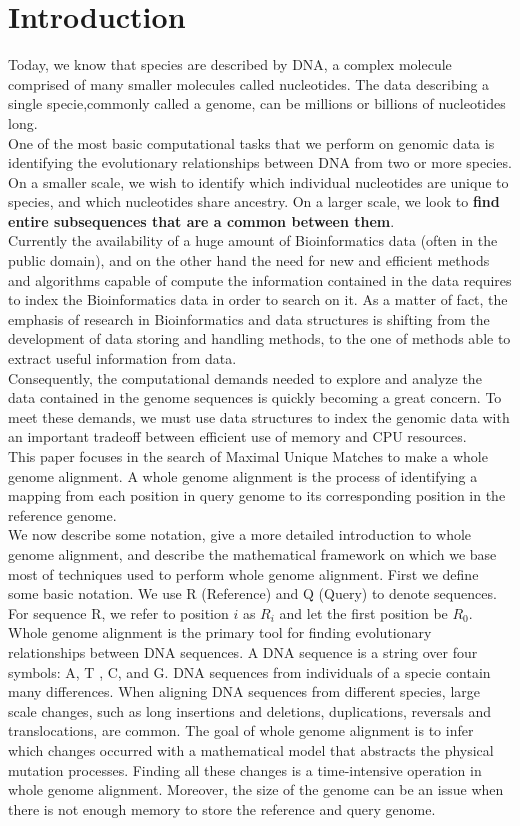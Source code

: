 \documentclass[runningheads,a4paper]{llncs}
\begin{document}
{\section{Introduction}
Today, we know that species are described by DNA, a complex molecule comprised of many smaller molecules called nucleotides. The data describing a single specie,commonly called a genome, can be millions or billions of nucleotides long.\\
One of the most basic computational tasks that we perform on genomic data is identifying the evolutionary relationships between DNA from two or more species. On a smaller scale, we wish to identify which individual nucleotides are unique to species, and which nucleotides share ancestry. On a larger scale, we look to \textbf{find entire subsequences that are a common between them}.\\
Currently the availability of a huge amount of  Bioinformatics data (often in the public domain), and on the other hand the  need for new and efficient methods and algorithms capable of  compute the information contained in the data requires to index the Bioinformatics data in order to search on it. As a matter of fact, the  emphasis of research in Bioinformatics and data structures is shifting from the development of data storing and handling methods, to the one of methods able to  extract useful information from data.\\
Consequently, the computational demands needed to explore and analyze the data contained in the genome sequences is quickly becoming a great concern. To meet these demands, we must use data structures to index the genomic data with an important tradeoff between efficient use of memory and CPU resources.\\
This paper focuses in the search of Maximal Unique Matches to make a whole genome alignment. A whole genome alignment is the process of identifying a mapping from each position in query genome to its corresponding position in the reference genome.\\ 
We now describe some notation, give a more detailed introduction to whole genome alignment, and describe the mathematical framework on which we base most of techniques used to perform whole genome alignment. First we define some basic notation. We use R (Reference) and Q (Query) to denote sequences. For sequence R, we refer to position $i$ as $R_{i}$ and let the first position be $R_{0}$.\\
Whole genome alignment is the primary tool for finding evolutionary relationships between DNA sequences. A DNA sequence is a string over four symbols: A, T , C, and G. DNA sequences from individuals of a specie contain many differences. When aligning DNA sequences from different species, large scale changes, such as long insertions and deletions, duplications, reversals and translocations, are common. The goal of whole genome alignment is to infer which changes occurred with a mathematical model that abstracts the physical mutation processes. Finding all these changes is a time-intensive operation in whole genome alignment. Moreover, the size of the genome can be an issue when there is not enough memory to store the reference and query genome.\\
}
\end{document}
